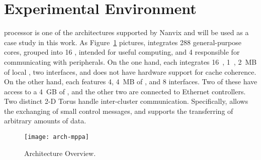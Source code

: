 \section{Experimental Environment}
\label{sec:platform}

	\mppa processor is one of the architectures supported by Nanvix and will be
	used as a case study in this work. As Figure~\ref{fig:mppa} pictures,
	\mppa integrates 288 general-purpose cores, grouped into 16 \cclusters,
	intended for useful computing, and 4 \ioclusters responsible for
	communicating with peripherals. On the one hand, each \ccluster integrates
	16~\pes, 1~\rman, 2~MB of local \sram, two \noc interfaces, and does not
	have hardware support for cache coherence. On the other hand, each
	\iocluster features 4\rmans, 4~MB of \sram, and 8 \noc interfaces. Two of
	these \ioclusters have access to a 4~GB of \dram, and the other two are
	connected to Ethernet controllers. Two distinct 2-D Torus \nocs handle
	inter-cluster communication. Specifically, \cnoc allows the exchanging of
	small control messages, and \dnoc supports the transferring of arbitrary
	amounts of data.

	\begin{figure}[b]
			\centering
			\texttt{[image: arch-mppa]}
			\caption{\mppa Architecture Overview.}
			\label{fig:mppa}
	\end{figure}


